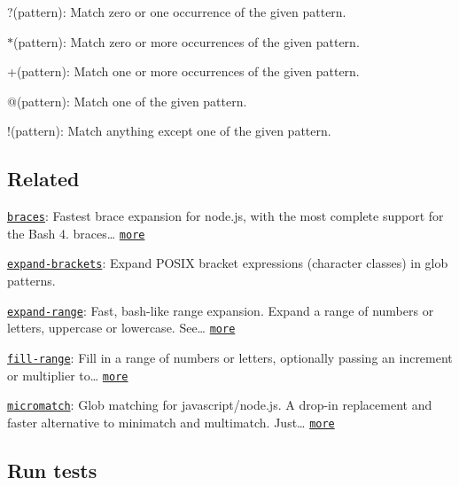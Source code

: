 \begin{DoxyItemize}
\item {\ttfamily ?(pattern)}\+: Match zero or one occurrence of the given pattern.
\item {\ttfamily $\ast$(pattern)}\+: Match zero or more occurrences of the given pattern.
\item {\ttfamily +(pattern)}\+: Match one or more occurrences of the given pattern.
\item {\ttfamily @(pattern)}\+: Match one of the given pattern.
\item {\ttfamily !(pattern)}\+: Match anything except one of the given pattern.
\end{DoxyItemize}

\subsection*{Related}


\begin{DoxyItemize}
\item \href{https://github.com/jonschlinkert/braces}{\tt braces}\+: Fastest brace expansion for node.\+js, with the most complete support for the Bash 4. braces… \href{https://github.com/jonschlinkert/braces}{\tt more}
\item \href{https://github.com/jonschlinkert/expand-brackets}{\tt expand-\/brackets}\+: Expand P\+O\+S\+IX bracket expressions (character classes) in glob patterns.
\item \href{https://github.com/jonschlinkert/expand-range}{\tt expand-\/range}\+: Fast, bash-\/like range expansion. Expand a range of numbers or letters, uppercase or lowercase. See… \href{https://github.com/jonschlinkert/expand-range}{\tt more}
\item \href{https://github.com/jonschlinkert/fill-range}{\tt fill-\/range}\+: Fill in a range of numbers or letters, optionally passing an increment or multiplier to… \href{https://github.com/jonschlinkert/fill-range}{\tt more}
\item \href{https://github.com/jonschlinkert/micromatch}{\tt micromatch}\+: Glob matching for javascript/node.\+js. A drop-\/in replacement and faster alternative to minimatch and multimatch. Just… \href{https://github.com/jonschlinkert/micromatch}{\tt more}
\end{DoxyItemize}

\subsection*{Run tests}

